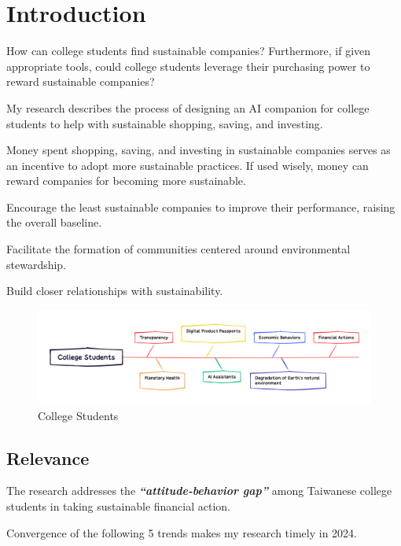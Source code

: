 \documentclass[
  letterpaper,
  DIV=11,
  numbers=noendperiod]{scrartcl}
\begin{document}
\newpage

\section{Introduction}\label{introduction}

How can college students find sustainable companies? Furthermore, if
given appropriate tools, could college students leverage their
purchasing power to reward sustainable companies?

My research describes the process of designing an AI companion for
college students to help with sustainable shopping, saving, and
investing.

Money spent shopping, saving, and investing in sustainable companies
serves as an incentive to adopt more sustainable practices. If used
wisely, money can reward companies for becoming more sustainable.

Encourage the least sustainable companies to improve their performance,
raising the overall baseline.

Facilitate the formation of communities centered around environmental
stewardship.

Build closer relationships with sustainability.

\begin{figure}[H]

{\centering \includegraphics[width=1\linewidth,height=\textheight,keepaspectratio]{./images/introduction/abstract.png}

}

\caption{College Students}

\end{figure}%

\subsection{Relevance}\label{relevance}

The research addresses the \textbf{\emph{``attitude-behavior gap''}}
among Taiwanese college students in taking sustainable financial action.

Convergence of the following 5 trends makes my research timely in 2024.
\end{document}
